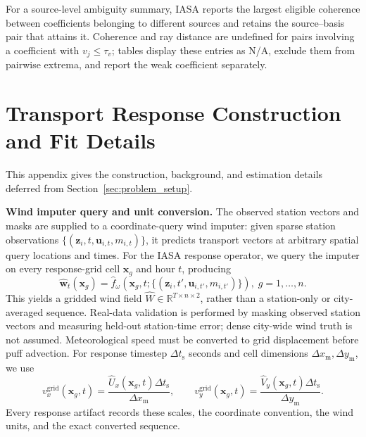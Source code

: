 For a source-level ambiguity summary, IASA reports the largest eligible
coherence between coefficients belonging to different sources and retains the
source--basis pair that attains it.  Coherence and ray distance are undefined
for pairs involving a coefficient with \(v_j\le\tau_v\); tables display these
entries as N/A, exclude them from pairwise extrema, and report the weak
coefficient separately.

\section{Transport Response Construction and Fit Details}
\label{app:transport_response}

This appendix gives the construction, background, and estimation details deferred
from Section~\ref{sec:problem_setup}.

\noindent\textbf{Wind imputer query and unit conversion.}
The observed station vectors and masks are supplied to a coordinate-query wind
imputer: given sparse station observations
\(\{(\mathbf z_i,t,\mathbf u_{i,t},m_{i,t})\}\), it predicts transport vectors
at arbitrary spatial query locations and times.  For the IASA response operator,
we query the imputer on every response-grid cell \(\mathbf x_g\) and hour
\(t\), producing
\begin{equation}
\widehat{\mathbf w}_t(\mathbf x_g)
=
\widehat f_{\omega}\!\left(\mathbf x_g,t;
\{(\mathbf z_i,t',\mathbf u_{i,t'},m_{i,t'})\}\right),
\; g=1,\ldots,n.
\label{eq:fieldformer_wind_field}
\end{equation}
This yields a gridded wind field
\(\widehat W\in\mathbb R^{T\times n\times 2}\), rather than a station-only or
city-averaged sequence.  Real-data validation is performed by masking observed
station vectors and measuring held-out station-time error; dense city-wide wind
truth is not assumed.  Meteorological speed must be converted to grid
displacement before puff advection.  For response timestep \(\Delta t_{\mathrm{s}}\)
seconds and cell dimensions \(\Delta x_{\mathrm{m}},\Delta y_{\mathrm{m}}\), we use
\begin{equation}
v_x^{\mathrm{grid}}(\mathbf x_g,t)
=
\frac{\widehat U_x(\mathbf x_g,t)\Delta t_{\mathrm{s}}}{\Delta x_{\mathrm{m}}},
\qquad
v_y^{\mathrm{grid}}(\mathbf x_g,t)
=
\frac{\widehat V_y(\mathbf x_g,t)\Delta t_{\mathrm{s}}}{\Delta y_{\mathrm{m}}}.
\label{eq:wind_unit_conversion}
\end{equation}
Every response artifact records these scales, the coordinate convention, the
wind units, and the exact converted sequence.

